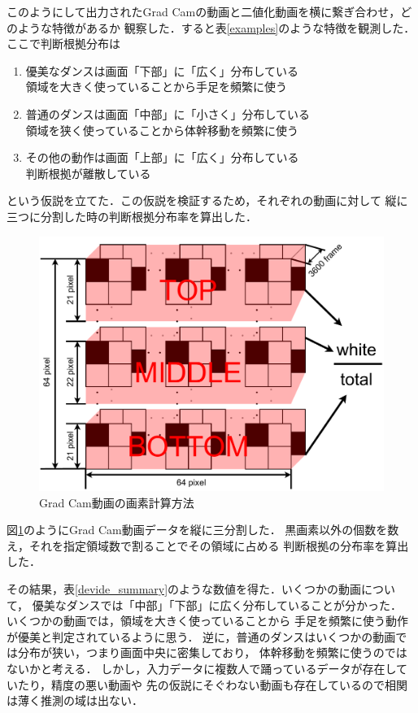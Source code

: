 このようにして出力されたGrad Camの動画と二値化動画を横に繋ぎ合わせ，どのような特徴があるか
観察した．すると表\ref{examples}のような特徴を観測した．
ここで判断根拠分布は
\begin{enumerate}
  \item 優美なダンスは画面「下部」に「広く」分布している \\
        領域を大きく使っていることから手足を頻繁に使う
  \item 普通のダンスは画面「中部」に「小さく」分布している \\
        領域を狭く使っていることから体幹移動を頻繁に使う
  \item その他の動作は画面「上部」に「広く」分布している \\
        判断根拠が離散している
\end{enumerate}
という仮説を立てた．この仮説を検証するため，それぞれの動画に対して
縦に三つに分割した時の判断根拠分布率を算出した．
\clearpage

\begin{figure}[t]
  \begin{center}
    \includegraphics[width=120mm]{images/chart/divide.pdf}
  \end{center}
  \caption{Grad Cam動画の画素計算方法}
  \label{divide_graph}
\end{figure}

図\ref{divide_graph}のようにGrad Cam動画データを縦に三分割した．
黒画素以外の個数を数え，それを指定領域数で割ることでその領域に占める
判断根拠の分布率を算出した．

その結果，表\ref{devide_summary}のような数値を得た．いくつかの動画について，
優美なダンスでは「中部」「下部」に広く分布していることが分かった．
いくつかの動画では，領域を大きく使っていることから
手足を頻繁に使う動作が優美と判定されているように思う．
逆に，普通のダンスはいくつかの動画では分布が狭い，つまり画面中央に密集しており，
体幹移動を頻繁に使うのではないかと考える．
しかし，入力データに複数人で踊っているデータが存在していたり，精度の悪い動画や
先の仮説にそぐわない動画も存在しているので相関は薄く推測の域は出ない．


